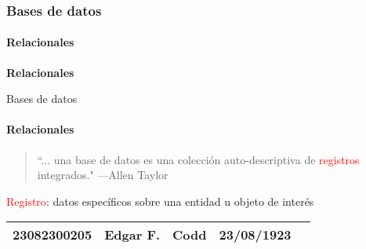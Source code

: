 \begin{frame}
    \frametitle{Bases de datos}
    \framesubtitle{Relacionales}

\begin{center}
    \Huge \textbf{Relacionales}
\end{center}
\end{frame}

\begin{frame}{Bases de datos}
    \framesubtitle{Relacionales}

    \begin{overlayarea}{\linewidth}{\textheight}
        \begin{onlyenv}
            \begin{block}{}
                \begin{quote}
                    ``... una base de datos es una colecci\'on auto-descriptiva de \textcolor{red}{registros} integrados."
                    \hspace{1em plus 1fill}---Allen Taylor
                \end{quote}
                
                \textcolor{red}{Registro}: datos espec\'ificos sobre una entidad u objeto de inter\'es
            \end{block}
      \end{onlyenv}
      \vspace{8mm}
      \centering
      \begin{tabular}{|c|c|c|c|c|}
          \hline
          23082300205 & Edgar F. & Codd & 23/08/1923\\
          \hline
      \end{tabular}
    \end{overlayarea}
\end{frame}

